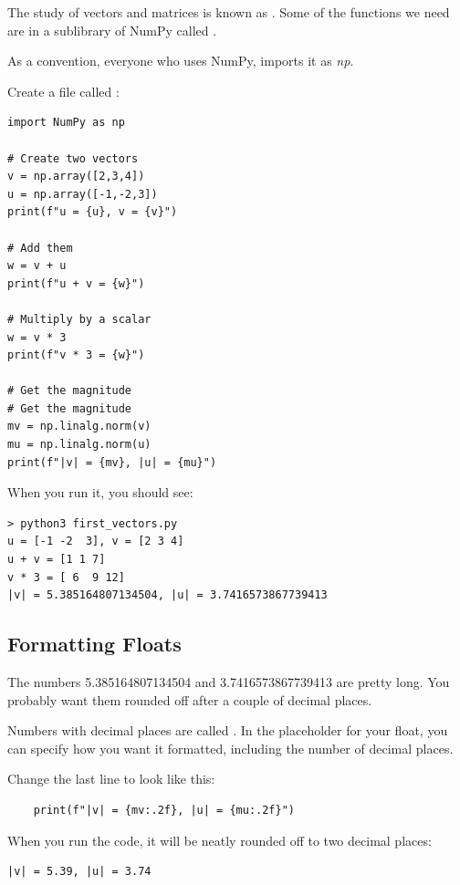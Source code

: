 The study of vectors and matrices is known as . Some 
of the functions we need are in a sublibrary of NumPy called . 

As a convention, everyone who uses NumPy, imports it as \textit{np}. 

Create a file called :

\begin{Verbatim}
import NumPy as np

# Create two vectors
v = np.array([2,3,4])
u = np.array([-1,-2,3])
print(f"u = {u}, v = {v}")

# Add them
w = v + u
print(f"u + v = {w}")

# Multiply by a scalar
w = v * 3
print(f"v * 3 = {w}")

# Get the magnitude
# Get the magnitude
mv = np.linalg.norm(v)
mu = np.linalg.norm(u)
print(f"|v| = {mv}, |u| = {mu}")
\end{Verbatim}

When you run it, you should see:

\begin{Verbatim}
> python3 first_vectors.py
u = [-1 -2  3], v = [2 3 4]
u + v = [1 1 7]
v * 3 = [ 6  9 12]
|v| = 5.385164807134504, |u| = 3.7416573867739413
\end{Verbatim}

\subsection{Formatting Floats}

The numbers 5.385164807134504 and 3.7416573867739413 are pretty long. You 
probably want them rounded off after a couple of decimal places.

Numbers with decimal places are called . In the placeholder 
for your float, you can specify how you want it formatted, including the 
number of decimal places.

Change the last line to look like this:
\begin{Verbatim}
    print(f"|v| = {mv:.2f}, |u| = {mu:.2f}")
\end{Verbatim}

When you run the code, it will be neatly rounded off to two decimal places:
\begin{Verbatim}
|v| = 5.39, |u| = 3.74
\end{Verbatim}

